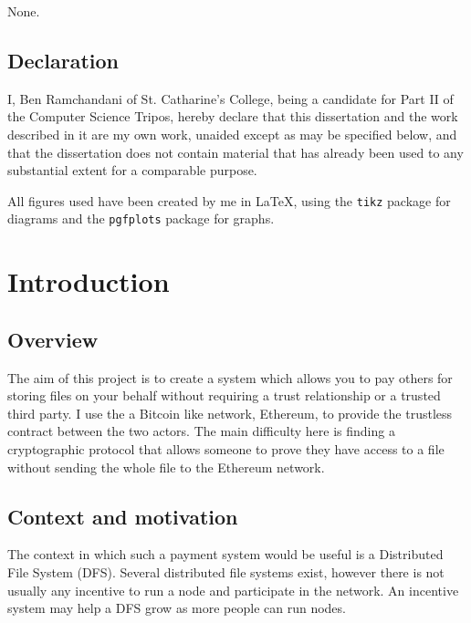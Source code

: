 \documentclass[12pt,a4paper,twoside,openright]{report}
\begin{document}
None.

\section*{Declaration}

I, Ben Ramchandani of St. Catharine's College, being a candidate for Part II of the Computer
Science Tripos, hereby declare
that this dissertation and the work described in it are my own work,
unaided except as may be specified below, and that the dissertation
does not contain material that has already been used to any substantial
extent for a comparable purpose.

\bigskip
{}

\medskip
{}

\newpage


\tableofcontents

\listoffigures

All figures used have been created by me in \LaTeX, using the \texttt{tikz} package for diagrams and the \texttt{pgfplots} package for graphs.

\chapter{Introduction}

\section{Overview}

The aim of this project is to create a system which allows you to pay others for storing files on your behalf without requiring a trust relationship or a trusted third party.
I use the a Bitcoin like network, Ethereum, to provide the trustless contract between the two actors.
The main difficulty here is finding a cryptographic protocol that allows someone to prove they have access to a file without sending the whole file to the Ethereum network.

\section{Context and motivation}

The context in which such a payment system would be useful is a Distributed File System (DFS).
Several distributed file systems exist, however there is not usually any incentive to run a node and participate in the network.
An incentive system may help a DFS grow as more people can run nodes.
\end{document}
